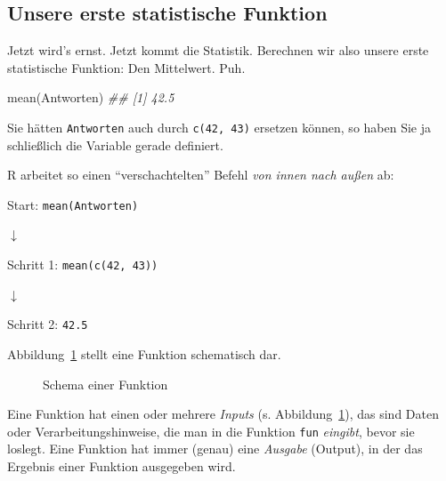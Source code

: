 \documentclass[
  a4paper,
]{scrbook}
\newenvironment{Shaded}{\begin{snugshade}}{\end{snugshade}}
\newcommand{\DocumentationTok}[1]{\textcolor[rgb]{0.37,0.37,0.37}{\textit{#1}}}
\newcommand{\FunctionTok}[1]{\textcolor[rgb]{0.28,0.35,0.67}{#1}}
\newcommand{\NormalTok}[1]{\textcolor[rgb]{0.00,0.23,0.31}{#1}}
\theoremstyle{definition}
\theoremstyle{definition}
\theoremstyle{definition}
\theoremstyle{remark}
\begin{document}
\subsection{Unsere erste statistische Funktion}\label{sec-first-fun}

Jetzt wird's ernst. Jetzt kommt die Statistik. Berechnen wir also unsere
erste statistische Funktion: Den Mittelwert. Puh.

\begin{Shaded}
\begin{Highlighting}[]
\FunctionTok{mean}\NormalTok{(Antworten)}
\DocumentationTok{\#\# [1] 42.5}
\end{Highlighting}
\end{Shaded}

Sie hätten \texttt{Antworten} auch durch \texttt{c(42,\ 43)} ersetzen
können, so haben Sie ja schließlich die Variable gerade definiert.

R arbeitet so einen ``verschachtelten'' Befehl \emph{von innen nach
außen} ab:

Start: \texttt{mean(Antworten)}

{\(\downarrow\)}

Schritt 1: \texttt{mean(c(42,\ 43))}

{\(\downarrow\)}

Schritt 2: \texttt{42.5}

Abbildung~\ref{fig-function-schema} stellt eine Funktion schematisch
dar.

\begin{figure}


\caption{\label{fig-function-schema}Schema einer Funktion}

\end{figure}%

Eine Funktion hat einen oder mehrere \emph{Inputs} (s.
Abbildung~\ref{fig-function-schema}), das sind Daten oder
Verarbeitungshinweise, die man in die Funktion \texttt{fun}
\emph{eingibt}, bevor sie loslegt. Eine Funktion hat immer (genau) eine
\emph{Ausgabe} (Output), in der das Ergebnis einer Funktion ausgegeben
wird.
\end{document}
